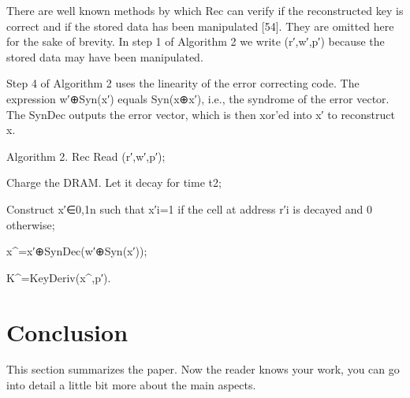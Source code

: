 \documentclass[journal, a4paper]{IEEEtran}
\begin{document}
There are well known methods by which Rec can verify if the reconstructed key is correct and if the stored data has been manipulated [54]. They are omitted here for the sake of brevity. In step 1 of Algorithm 2 we write (r′,w′,p′) because the stored data may have been manipulated.

Step 4 of Algorithm 2 uses the linearity of the error correcting code. The expression w′⊕Syn(x′) equals Syn(x⊕x′), i.e., the syndrome of the error vector. The SynDec outputs the error vector, which is then xor'ed into x′ to reconstruct x.

Algorithm 2. Rec
Read (r′,w′,p′);

Charge the DRAM. Let it decay for time t2;

Construct x′∈{0,1}n such that x′i=1 if the cell at address r′i is decayed and 0 otherwise;

x^=x′⊕SynDec(w′⊕Syn(x′));

K^=KeyDeriv(x^,p′).

\section{Conclusion}
This section summarizes the paper. Now the reader knows your work, you can go into detail a little bit more about the main aspects.
\end{document}
